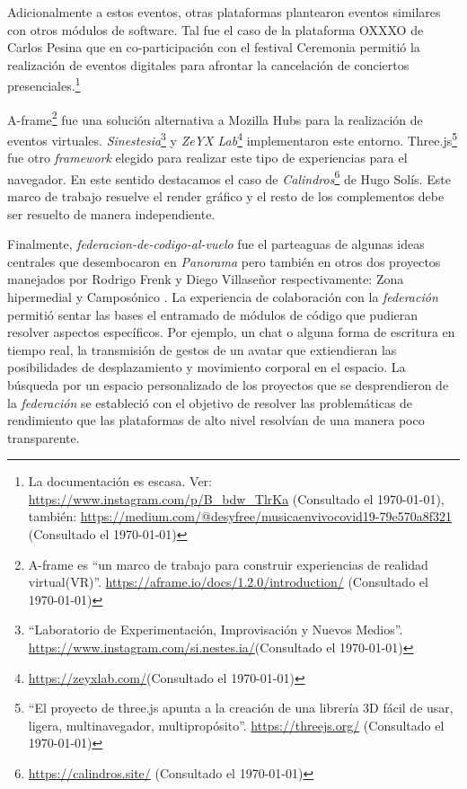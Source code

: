 Adicionalmente a estos eventos, otras plataformas plantearon eventos similares con otros módulos de software. Tal fue el caso de la plataforma OXXXO de Carlos Pesina que en co-participación con el festival Ceremonia permitió la realización de eventos digitales para afrontar la cancelación de conciertos presenciales.\footnote{La documentación es escasa. Ver: \url{https://www.instagram.com/p/B_bdw_TlrKa} (Consultado el \today), también: \url{https://medium.com/@desyfree/musicaenvivocovid19-79e570a8f321} (Consultado el \today)}

A-frame\footnote{ A-frame es ``un marco de trabajo para construir experiencias de realidad virtual(VR)''. \url{https://aframe.io/docs/1.2.0/introduction/} (Consultado el \today)} fue una solución alternativa a Mozilla Hubs para la realización de eventos virtuales. \textit{Sinestesia}\footnote{``Laboratorio de Experimentación, Improvisación y Nuevos Medios''. \url{https://www.instagram.com/si.nestes.ia/}(Consultado el \today)} y \textit{ZeYX Lab}\footnote{\url{https://zeyxlab.com/}(Consultado el \today)} implementaron este entorno. Three.js\footnote{``El proyecto de three.js apunta a la creación de una librería 3D fácil de usar, ligera, multinavegador, multipropósito''. \url{https://threejs.org/} (Consultado el \today)} fue otro \textit{framework} elegido para realizar este tipo de experiencias para el navegador. En este sentido destacamos el caso de \textit{Calindros}\footnote{\url{https://calindros.site/} (Consultado el \today)} de Hugo Solís. Este marco de trabajo resuelve el render gráfico y el resto de los complementos debe ser resuelto de manera independiente. %

Finalmente, \textit{federacion-de-codigo-al-vuelo} \citep{en-vivo} fue el parteaguas de algunas ideas centrales que desembocaron en \textit{Panorama} pero también en otros dos proyectos manejados por Rodrigo Frenk y Diego Villaseñor respectivamente: Zona hipermedial y Camposónico \citep{camposonico}. La experiencia de colaboración con la \textit{federación} permitió sentar las bases el entramado de módulos de código que pudieran resolver aspectos específicos. Por ejemplo,  un chat o alguna forma de escritura en tiempo real, la transmisión de gestos de un avatar que extiendieran las posibilidades de desplazamiento y movimiento corporal en el espacio. La búsqueda por un espacio personalizado de los proyectos que se desprendieron de la \textit{federación} se estableció con el objetivo de resolver las problemáticas de rendimiento que las plataformas de alto nivel resolvían de una manera poco transparente. 

